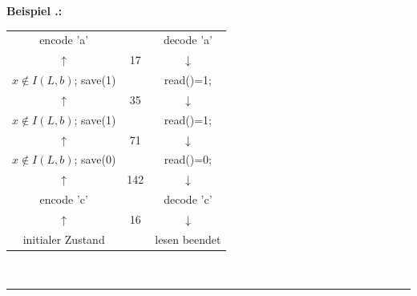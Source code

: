 \documentclass[a4paper,12pt]{article}
\newcounter{Beispiel}
\newenvironment{Beispiel}{
\medskip
        
        \setlength{\parindent}{0pt}
        \addtocounter{Beispiel}{1}
        \textbf{\textsf{Beispiel \thesubsection.\theBeispiel}:}\\}{
        \nopagebreak
        \vspace{-1.0ex}
        \bigskip
        
}
\begin{document}
\begin{Beispiel}
\begin{center}
\begin{tabular}{c c c}
\\
encode 'a' & & decode 'a'
\\
$\uparrow$ & 17 & $\downarrow$
\\
$x \not\in I(L,b)$; save(1) &  &  read()=1;
\\
$\uparrow$ & 35 & $\downarrow$
\\
$x \not\in I(L,b)$; save(1) &  & read()=1;
\\
$\uparrow$ & 71 & $\downarrow$
\\
$x \not\in I(L,b)$; save(0) &  &  read()=0;
\\
$\uparrow$ & 142 & $\downarrow$
\\
encode 'c' & & decode 'c'
\\
$\uparrow$ & 16  & $\downarrow$
\\
initialer Zustand & & lesen beendet
\end{tabular}
\\
{\color{gray!50!red}\rule{8cm}{0.1mm}}
\end{center}
\end{Beispiel}
\end{document}
